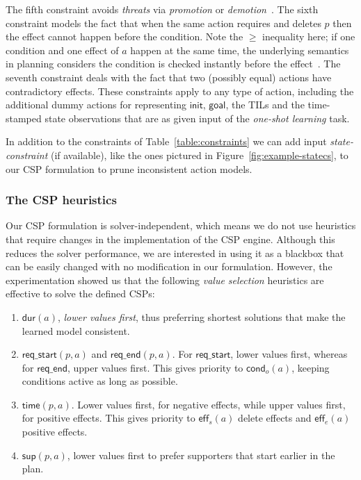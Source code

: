 \documentclass{ecai}
\newcommand{\eff}{\mathsf{eff}}    %
\newcommand{\cond}{\mathsf{cond}}  %
\newcommand{\dur}{\mathsf{dur}}    %
\newcommand{\supp}{\mathsf{sup}}   %
\newcommand{\tim}{\mathsf{time}}   %
\newcommand{\reqs}{\mathsf{req\_{start}}} %
\newcommand{\reqe}{\mathsf{req\_{end}}}   %
\newcommand{\ini}{\mathsf{init}}   %
\newcommand{\goal}{\mathsf{goal}}  %
\begin{document}
The fifth constraint avoids {\em threats} via {\em promotion} or {\em demotion}~\cite{ghallab2004automated}. The sixth constraint models the fact that when the same action requires and deletes $p$ then the effect cannot happen before the condition. Note the $\geq$ inequality here; if one condition and one effect of $a$ happen at the same time, the underlying semantics in planning considers the condition is checked instantly before the effect~\cite{fox2003pddl2}. The seventh constraint deals with the fact that two (possibly equal) actions have contradictory effects. These constraints apply to any type of action, including the additional dummy actions for representing $\ini$, $\goal$, the TILs and the time-stamped state observations that are as given input of the {\em one-shot learning} task.

In addition to the constraints of Table~\ref{table:constraints} we can add input {\em state-constraint} (if available), like the ones pictured in Figure~\ref{fig:example-statecs}, to our CSP formulation to prune inconsistent action models.

\subsubsection{The CSP heuristics}
\label{sec:implementation}
Our CSP formulation is solver-independent, which means we do not use heuristics that require changes in the implementation of the CSP engine. Although this reduces the solver performance, we are interested in using it as a blackbox that can be easily changed with no modification in our formulation. However, the experimentation showed us that the following {\em value selection} heuristics are effective to solve the defined CSPs:
\begin{enumerate}
\item $\dur(a)$, {\em lower values first}, thus preferring shortest solutions that make the learned model consistent.
\item $\reqs(p,a)$ and $\reqe(p,a)$. For $\reqs$, lower values first, whereas for $\reqe$, upper values first. This gives priority to $\cond_o(a)$, keeping conditions active as long as possible.  
\item $\tim(p,a)$. Lower values first, for negative effects, while upper values first, for positive effects. This gives priority to $\eff_s(a)$ delete effects and $\eff_e(a)$ positive effects. 
\item $\supp(p,a)$, lower values first to prefer supporters that start earlier in the plan.
\end{enumerate}
\end{document}
